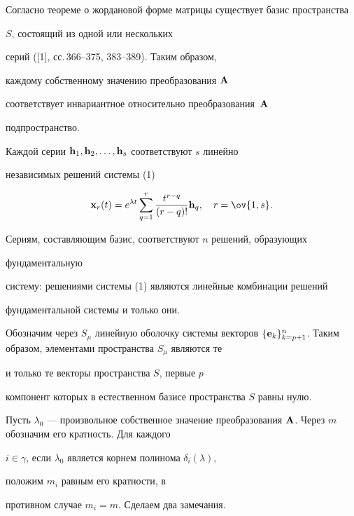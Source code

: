 Согласно теореме о жордановой форме матрицы существует базис пространства 


$S$, состоящий из одной или нескольких 


серий ([1], сс.\,366--375, 383--389). Таким образом, 


каждому собственному значению преобразования $\bold A$ 


соответствует инвариантное относительно преобразования~$\bold A$ 


подпространство. 


 


Каждой серии $\bold h_1,\bold h_2,\dotsc,\bold h_s$ соответствуют $s$ линейно 


независимых решений системы (1) 


$$ 


\bold x_r(t)=e^{\lambda t}\sum^r_{q=1} 


\frac{t^{r-q}}{(r-q)!}\bold h_q,\quad r=\ov{1,s}. 


$$ 


Сериям, составляющим базис, соответствуют $n$ решений, образующих 


фундаментальную 


систему: решениями системы (1) являются линейные комбинации решений 


фундаментальной системы и только они. 


 


Обозначим через $S_\mu$ линейную оболочку системы векторов $\{\bold 


e_k\}^n_{k=p+1}$. Таким образом, элементами пространства $S_\mu$ являются те 


и только те векторы пространства $S$, первые $p$ 


компонент которых в естественном базисе пространства $S$ равны нулю. 


 


Пусть $\lambda_0$ --- произвольное собственное значение преобразования $\bold 


A$. Через $m$ обозначим его кратность. Для каждого 


$i\in\gamma$, если $\lambda_0$ является корнем полинома $\delta_i(\lambda)$, 


положим $m_i$ равным его кратности, в 


противном случае $m_i=m$. Сделаем два замечания. 


